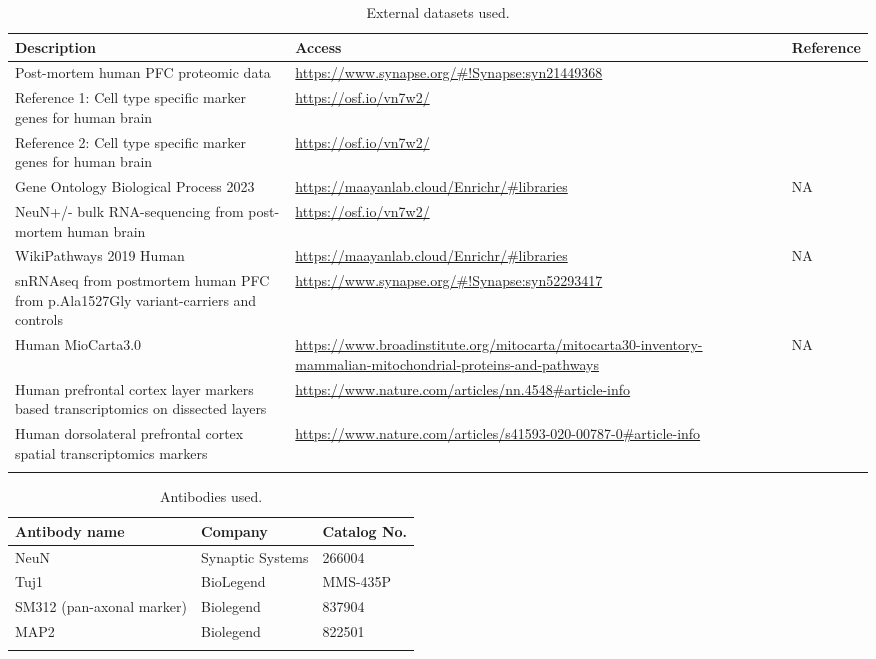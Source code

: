 \clearpage
\begin{longtable}{p{7cm} p{7cm} p{3cm}}
    \caption{External datasets used.}
    \hline
    \textbf{Description} & \textbf{Access} & \textbf{Reference} \\ 
    \hline
    \hline
    Post-mortem human PFC proteomic data & \url{https://www.synapse.org/\#!Synapse:syn21449368} & \cite{Johnson2020-ib} \\
    \hline
    Reference 1: Cell type specific marker genes for human brain & \url{https://osf.io/vn7w2/} & \cite{Wang2018-im} \\
    \hline
    Reference 2: Cell type specific marker genes for human brain & \url{https://osf.io/vn7w2/} & \cite{Franzen2019-hh} \\
    \hline
    Gene Ontology Biological Process 2023 & \url{https://maayanlab.cloud/Enrichr/\#libraries} & NA \\
    \hline
    NeuN+/- bulk RNA-sequencing from post-mortem human brain & \url{https://osf.io/vn7w2/} & \cite{Welch2022-ef} \\
    \hline
    WikiPathways 2019 Human & \url{https://maayanlab.cloud/Enrichr/\#libraries} & NA \\
    \hline
    snRNAseq from postmortem human PFC from p.Ala1527Gly variant-carriers and controls & \url{https://www.synapse.org/\#!Synapse:syn52293417} & \cite{Mathys2023-rs} \\ 
    \hline
    Human MioCarta3.0 & \url{https://www.broadinstitute.org/mitocarta/mitocarta30-inventory-mammalian-mitochondrial-proteins-and-pathways} & NA \\
    \hline
    Human prefrontal cortex layer markers based transcriptomics on dissected layers & \url{https://www.nature.com/articles/nn.4548#article-info} & \cite{He2017-dq} \\
    \hline
    Human dorsolateral prefrontal cortex spatial transcriptomics markers & \url{https://www.nature.com/articles/s41593-020-00787-0#article-info} & \cite{Maynard2021-mz} \\
    \hline
    \label{tab:external_datasets}
\end{longtable}

\clearpage
\begin{longtable}{p{6cm} p{5cm} p{6cm}}
    \caption{Antibodies used.}
    \hline
    \textbf{Antibody name}                & \textbf{Company}      & \textbf{Catalog No.} \\
    \hline
    \hline
    NeuN                                  & Synaptic Systems      & 266004               \\
    \hline
    Tuj1                                  & BioLegend             & MMS-435P             \\
    \hline
    SM312 (pan-axonal marker)             & Biolegend             & 837904               \\
    \hline
    MAP2                                  & Biolegend             & 822501               \\
    \hline
    \label{tab:antibodies_used}
\end{longtable}

    
    